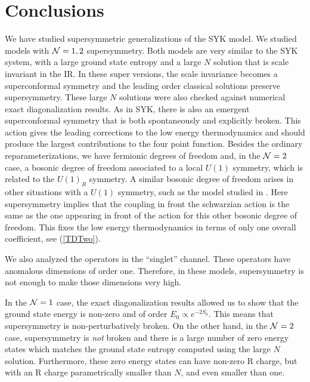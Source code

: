 \documentclass[aps,pre,preprint,onecolumn,citeautoscript,superscriptaddress,nofootinbib,eqsecnum]{revtex4-1}
\def\nref#1{(\ref{#1})}
\begin{document}
\section{Conclusions}

 
We have studied  supersymmetric generalizations of the SYK model. We studied models with ${\cal N} =1,2$ supersymmetry. 
Both  models are very similar to the SYK system, with a large ground state entropy and 
 a   large $N$ solution that is scale invariant in the IR. In these super versions, the scale invariance becomes a superconformal symmetry and the leading order 
 classical solutions preserve supersymmetry. These large $N$ solutions were also checked against numerical exact diagonalization results. 
 As in SYK, there is also 
 an emergent superconformal symmetry that is both spontaneously and explicitly broken. This action gives the leading corrections to the low energy thermodynamics and
 should produce the largest contributions to the four point function. Besides the ordinary reparameterizations, we have fermionic degrees of freedom and, in the 
 ${\cal N}=2$ case, a bosonic degree of freedom associated to a local $U(1)$ symmetry, which is related to the $U(1)_R$ symmetry. 
  A similar bosonic degree of freedom arises in other situations with a $U(1)$ symmetry, such as the model studied in \cite{SS15}. Here supersymmetry implies 
  that the coupling in front the schwarzian action is the same as the one appearing in front of the action for this other bosonic degree of freedom. This fixes the low energy thermodynamics in terms of only one 
overall coefficient, see \nref{TDTwo}. 
   
  We also analyzed the operators in the ``singlet'' channel. These operators have anomalous dimensions of order one. Therefore, in these models, supersymmetry is
  not enough to make those dimensions very high. 
  
 In the ${\cal N}=1$ case, the exact diagonalization results allowed us to show that the ground state energy is non-zero and of order $E_0 \propto e^{ - 2 S_0 }$. 
 This means that supersymmetry is non-perturbatively broken. 
 On the other hand,  in the ${\cal N}=2$ case, supersymmetry is {\it not} broken and there is a large number of zero energy states which matches the ground state
 entropy computed using the  large $N$ solution. 
  Furthermore, these zero energy states can have non-zero R charge, but with an R charge parametrically smaller than $N$, and even smaller than one. 
 
\end{document}

